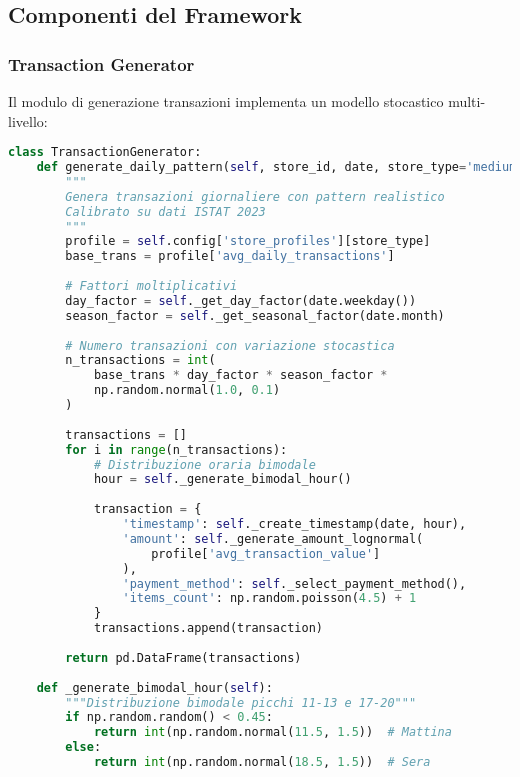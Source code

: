 \subsection{\texorpdfstring{Componenti del Framework}{B.1.3 - Componenti del Framework}}

\subsubsection{\texorpdfstring{Transaction Generator}{B.1.3.1 - Transaction Generator}}

Il modulo di generazione transazioni implementa un modello stocastico multi-livello:

\begin{lstlisting}[language=Python, caption={Generazione transazioni con pattern temporale bimodale}, label={lst:transaction-gen}]
class TransactionGenerator:
    def generate_daily_pattern(self, store_id, date, store_type='medium'):
        """
        Genera transazioni giornaliere con pattern realistico
        Calibrato su dati ISTAT 2023
        """
        profile = self.config['store_profiles'][store_type]
        base_trans = profile['avg_daily_transactions']
        
        # Fattori moltiplicativi
        day_factor = self._get_day_factor(date.weekday())
        season_factor = self._get_seasonal_factor(date.month)
        
        # Numero transazioni con variazione stocastica
        n_transactions = int(
            base_trans * day_factor * season_factor * 
            np.random.normal(1.0, 0.1)
        )
        
        transactions = []
        for i in range(n_transactions):
            # Distribuzione oraria bimodale
            hour = self._generate_bimodal_hour()
            
            transaction = {
                'timestamp': self._create_timestamp(date, hour),
                'amount': self._generate_amount_lognormal(
                    profile['avg_transaction_value']
                ),
                'payment_method': self._select_payment_method(),
                'items_count': np.random.poisson(4.5) + 1
            }
            transactions.append(transaction)
            
        return pd.DataFrame(transactions)
    
    def _generate_bimodal_hour(self):
        """Distribuzione bimodale picchi 11-13 e 17-20"""
        if np.random.random() < 0.45:
            return int(np.random.normal(11.5, 1.5))  # Mattina
        else:
            return int(np.random.normal(18.5, 1.5))  # Sera
\end{lstlisting}

